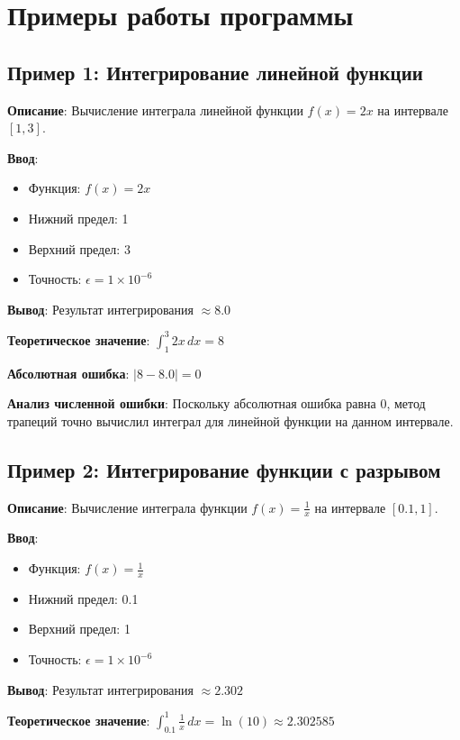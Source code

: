 \section{Примеры работы программы}

\subsection{Пример 1: Интегрирование линейной функции}

\textbf{Описание}: Вычисление интеграла линейной функции \(f(x) = 2x\) на интервале \([1, 3]\).

\textbf{Ввод}:
\begin{itemize}
    \item Функция: \(f(x) = 2x\)
    \item Нижний предел: 1
    \item Верхний предел: 3
    \item Точность: \(\epsilon = 1 \times 10^{-6}\)
\end{itemize}

\textbf{Вывод}: Результат интегрирования \(\approx 8.0\)

\textbf{Теоретическое значение}: \(\int_1^3 2x \, dx = 8\)

\textbf{Абсолютная ошибка}: \(|8 - 8.0| = 0\)

\textbf{Анализ численной ошибки}: Поскольку абсолютная ошибка равна 0, метод трапеций точно вычислил интеграл для линейной функции на данном интервале.

\subsection{Пример 2: Интегрирование функции с разрывом}

\textbf{Описание}: Вычисление интеграла функции \(f(x) = \frac{1}{x}\) на интервале \([0.1, 1]\).

\textbf{Ввод}:
\begin{itemize}
    \item Функция: \(f(x) = \frac{1}{x}\)
    \item Нижний предел: 0.1
    \item Верхний предел: 1
    \item Точность: \(\epsilon = 1 \times 10^{-6}\)
\end{itemize}

\textbf{Вывод}: Результат интегрирования \(\approx 2.302\)

\textbf{Теоретическое значение}: \(\int_{0.1}^1 \frac{1}{x} \, dx = \ln(10) \approx 2.302585\)

